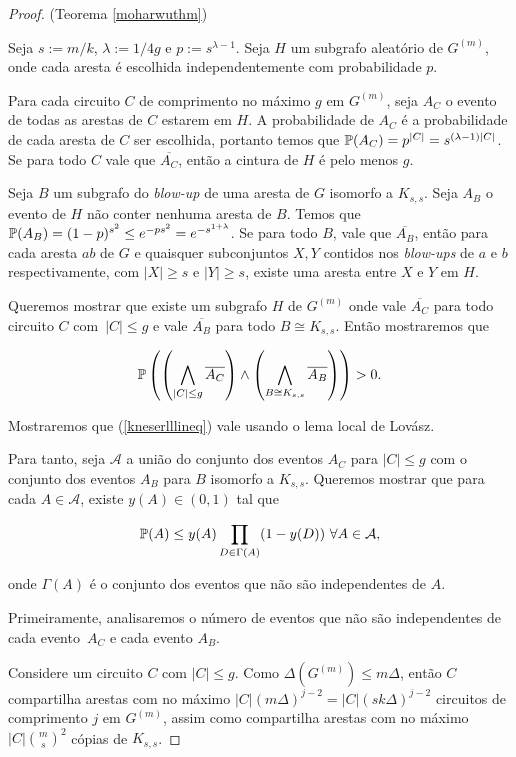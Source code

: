 \begin{proof}{(Teorema \ref{moharwuthm})}

Seja $s := m/k$, $\lambda := 1/4g$ e $p := s^{\lambda-1}$. Seja $H$ um subgrafo aleatório de $G^{(m)}$, onde cada aresta é escolhida independentemente com probabilidade $p$.

Para cada circuito $C$ de comprimento no máximo $g$ em $G^{(m)}$, seja $A_C$ o evento de todas as arestas de $C$ estarem em $H$. A probabilidade de $A_C$ é a probabilidade de cada aresta de $C$ ser escolhida, portanto temos que $\mathbb{P}(A_C) = p^{|C|} = s^{(\lambda-1)|C|}$. Se para todo $C$ vale que $\overline{A_C}$, então a cintura de $H$ é pelo menos $g$.

Seja $B$ um subgrafo do \textit{blow-up} de uma aresta de $G$ isomorfo a $K_{s,s}$. Seja $A_B$ o evento de $H$ não conter nenhuma aresta de $B$. Temos que $\mathbb{P}(A_B) = (1-p)^{s^2} \leq e^{-ps^2} = e^{-s^{1+\lambda}}$. Se para todo $B$, vale que $\overline{A_B}$, então para cada aresta $ab$ de $G$ e quaisquer subconjuntos $X,Y$ contidos nos \textit{blow-ups} de $a$ e $b$ respectivamente, com $|X| \geq s$ e $|Y| \geq s$, existe uma aresta entre $X$ e $Y$ em $H$.

Queremos mostrar que existe um subgrafo $H$ de $G^{(m)}$ onde vale $\overline{A_C}$ para todo circuito $C$ com~$|C| \leq g$ e vale $\overline{A_B}$ para todo $B \cong K_{s,s}$. Então mostraremos que

\begin{equation}\label{kneserlllineq}
\mathbb{P}\left(\left(\bigwedge\limits_{|C|\leq g}\overline{A_C}\right)\wedge\left(\bigwedge\limits_{B\cong K_{s,s}}\overline{A_B}\right)\right) > 0.
\end{equation}

Mostraremos que (\ref{kneserlllineq}) vale usando o lema local de Lovász.

Para tanto, seja $\mathcal{A}$ a união do conjunto dos eventos $A_C$ para $|C| \leq g$ com o conjunto dos eventos $A_B$ para $B$ isomorfo a $K_{s,s}$. Queremos mostrar que para cada $A\in\mathcal{A}$, existe $y(A) \in (0,1)$ tal que

\[\mathbb{P}(A)\leq y(A) \prod_{D\in \Gamma(A)}(1-y(D))\ \forall A\in\mathcal{A},\]

onde $\Gamma(A)$ é o conjunto dos eventos que não são independentes de $A$.

Primeiramente, analisaremos o número de eventos que não são independentes de cada evento~$A_C$ e cada evento $A_B$.

Considere um circuito $C$ com $|C| \leq g$. Como $\Delta(G^{(m)}) \leq m\Delta$, então $C$ compartilha arestas com no máximo $|C|(m\Delta)^{j-2} = |C|(sk\Delta)^{j-2}$ circuitos de comprimento $j$ em $G^{(m)}$, assim como compartilha arestas com no máximo $|C|\binom{m}{s}^2$ cópias de $K_{s,s}$.


\end{proof}
